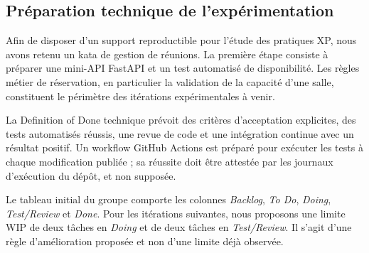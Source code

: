 \subsection{Préparation technique de l'expérimentation}

Afin de disposer d'un support reproductible pour l'étude des pratiques XP,
nous avons retenu un kata de gestion de réunions. La première étape consiste
à préparer une mini-API FastAPI et un test automatisé de disponibilité.
Les règles métier de réservation, en particulier la validation de la
capacité d'une salle, constituent le périmètre des itérations expérimentales
à venir.

La Definition of Done technique prévoit des critères d'acceptation explicites,
des tests automatisés réussis, une revue de code et une intégration continue
avec un résultat positif. Un workflow GitHub Actions est préparé pour
exécuter les tests à chaque modification publiée ; sa réussite doit être
attestée par les journaux d'exécution du dépôt, et non supposée.

Le tableau initial du groupe comporte les colonnes \textit{Backlog},
\textit{To Do}, \textit{Doing}, \textit{Test/Review} et \textit{Done}.
Pour les itérations suivantes, nous proposons une limite WIP de deux tâches
en \textit{Doing} et de deux tâches en \textit{Test/Review}. Il s'agit
d'une règle d'amélioration proposée et non d'une limite déjà observée.
